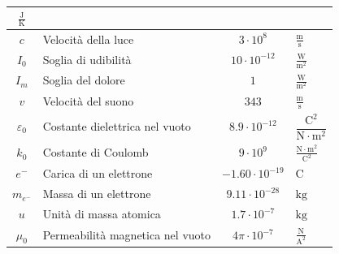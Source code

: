 \documentclass[8pt, a4paper, twocolumn, usenames, dvipsnames]{extarticle}
\begin{document}
\begin{center}
\begin{xtabular}{c M{1.8cm} c M{1.5cm}}
		$\frac{\text{J}}{\text{K}}$\\ \midrule
		\label{tab:c} 
		$c$ & Velocità della luce & $3\cdot10^8$ & $\frac{\text{m}}{\text{s}}$\\\midrule
		\label{tab:I0} 
		$I_0$ & Soglia di udibilità & $10\cdot10^{-12}$ & 
		$\frac{\text{W}}{\text{m}^2}$\\ \midrule
		\label{tab:Im} 
		$I_m$ & Soglia del dolore & $1$ & $\frac{\text{W}}{\text{m}^2}$\\ \midrule
		\label{tab:vs} 
		$v$ & Velocità del suono & $343$ & $\frac{\text{m}}{\text{s}}$\\ \midrule
		\label{tab:e0} 
		$\varepsilon_0$& Costante dielettrica nel vuoto&$8.9\cdot10^{-12}$&
		$\dfrac{\text{C}^2}{\text{N}\cdot\text{m}^2}$\\ \midrule
		\label{tab:k0}
		$k_0$ & Costante di Coulomb & $9\cdot10^9$ & 
		$\frac{\text{N}\cdot\text{m}^2}{\text{C}^2}$\\ \midrule
		\label{tab:e-} 
		$e^{-}$ & Carica di un elettrone & $-1.60\cdot10^{-19}$ & $\text{C}$\\ \midrule
		\label{tab:me-} 
		$m_{e^{-}}$ & Massa di un elettrone & $9.11\cdot10^{-28}$ & $\text{kg}$\\\midrule
		\label{tab:u} 
		$u$ & Unità di massa atomica & $1.7\cdot10^{-7}$ & $\text{kg}$\\\midrule
		\label{tab:mu0} 
		$\mu_0$ & Permeabilità magnetica nel vuoto & $4\pi\cdot10^{-7}$ & 
		$\frac{\text{N}}{\text{A}^2}$\\
		\midrule
	\end{xtabular}
\end{center}

\newpage
\end{document}
